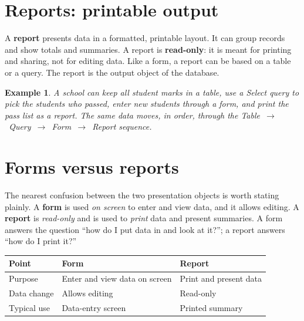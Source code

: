 \documentclass[11pt]{article}
\newtheorem{example}{Example}[section]
\begin{document}
\section{Reports: printable output}
A \textbf{report} presents data in a formatted, printable layout. It can
group records and show totals and summaries. A report is \textbf{read-only}:
it is meant for printing and sharing, not for editing data. Like a form, a
report can be based on a table or a query. The report is the output object of
the database.

\begin{example}
A school can keep all student marks in a table, use a Select query to pick
the students who passed, enter new students through a form, and print the
pass list as a report. The same data moves, in order, through the
Table~$\rightarrow$~Query~$\rightarrow$~Form~$\rightarrow$~Report sequence.
\end{example}

\section{Forms versus reports}
The nearest confusion between the two presentation objects is worth stating
plainly. A \textbf{form} is used \emph{on screen} to enter and view data, and
it allows editing. A \textbf{report} is \emph{read-only} and is used to
\emph{print} data and present summaries. A form answers the question ``how do
I put data in and look at it?''; a report answers ``how do I print it?''

\begin{center}
\begin{tabular}{p{}p{}p{}}
\toprule
\textbf{Point} & \textbf{Form} & \textbf{Report} \\
\midrule
Purpose & Enter and view data on screen & Print and present data \\
Data change & Allows editing & Read-only \\
Typical use & Data-entry screen & Printed summary \\
\bottomrule
\end{tabular}
\end{center}
\end{document}
